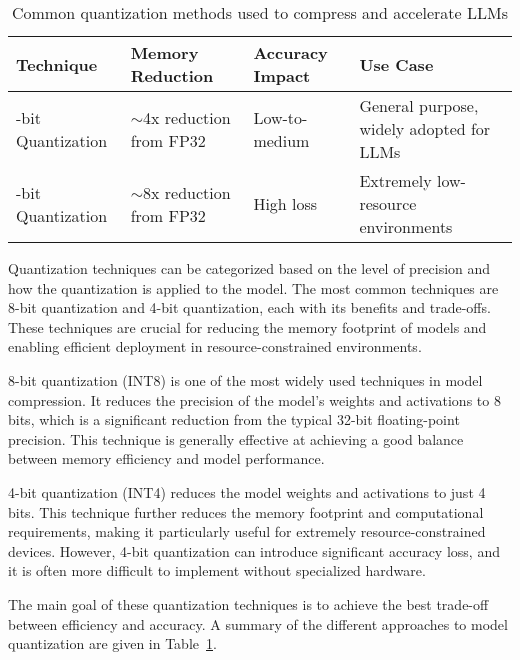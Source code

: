 \begin{table}[t]
  \centering
  \scriptsize
  \renewcommand{\arraystretch}{1.3}
  \begin{tabularx}{0.95\textwidth}{
    >{\raggedright\arraybackslash}p{3.5cm}
    >{\centering\arraybackslash}p{3.5cm}
    >{\centering\arraybackslash}p{3cm}
    >{\raggedright\arraybackslash}X
  }
    \toprule
    \textbf{Technique} & \textbf{Memory Reduction} & \textbf{Accuracy Impact} & \textbf{Use Case} \\
    \midrule
    8-bit Quantization & $\sim$4x reduction from FP32 & Low-to-medium & General purpose, widely adopted for LLMs \\
    4-bit Quantization & $\sim$8x reduction from FP32 & High loss & Extremely low-resource environments \\
    \bottomrule
  \end{tabularx}
  \caption{Common quantization methods used to compress and accelerate LLMs}
  \label{table:common_quant}
\end{table}

Quantization techniques can be categorized based on the level of precision and how the
quantization is applied to the model. The most common techniques are 8-bit quantization
and 4-bit quantization, each with its benefits and trade-offs. These techniques are crucial
for reducing the memory footprint of models and enabling efficient deployment in resource-constrained
environments.

8-bit quantization (INT8) is one of the most widely used techniques in model compression.
It reduces the precision of the model's weights and activations to 8 bits, which
is a significant reduction from the typical 32-bit floating-point precision. This technique
is generally effective at achieving a good balance between memory efficiency and model
performance.

4-bit quantization (INT4) reduces the model weights and activations to just 4 bits.
This technique further reduces the memory footprint and computational requirements,
making it particularly useful for extremely resource-constrained devices. However, 4-bit
quantization can introduce significant accuracy loss, and it is often more difficult to
implement without specialized hardware.

The main goal of these quantization techniques is to achieve the best trade-off between
efficiency and accuracy. A summary of the different approaches to model quantization are given in Table~\ref{table:common_quant}.

